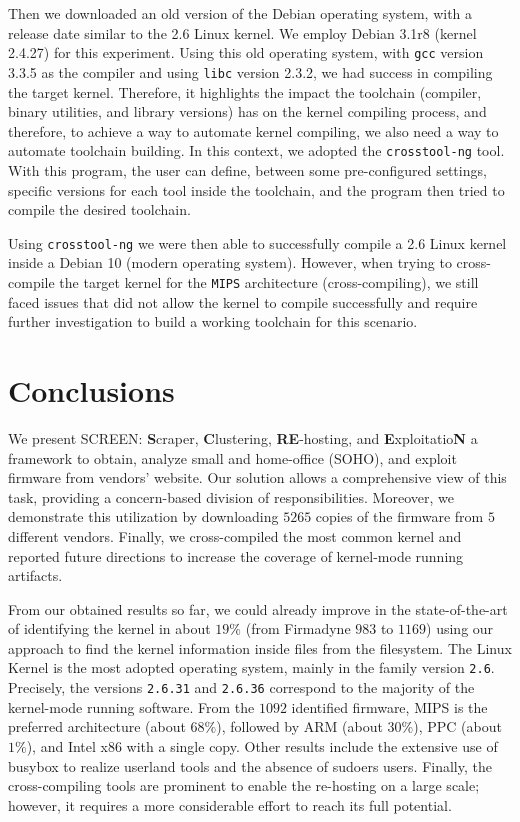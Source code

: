 \documentclass[12pt]{article}
\begin{document}
Then we downloaded an old version of the Debian operating system, with a release date similar to the 2.6 Linux kernel. We employ Debian 3.1r8 (kernel 2.4.27) for this experiment. Using this old operating system, with {\tt gcc} version 3.3.5 as the compiler and using {\tt libc} version 2.3.2, we had success in compiling the target kernel. Therefore, it highlights the impact the toolchain (compiler, binary utilities, and library versions) has on the kernel compiling process, and therefore, to achieve a way to automate kernel compiling, we also need a way to automate toolchain building. In this context, we adopted the {\tt crosstool-ng} tool. With this program, the user can define, between some pre-configured settings, specific versions for each tool inside the toolchain, and the program then tried to compile the desired toolchain.

Using {\tt crosstool-ng} we were then able to successfully compile a 2.6 Linux kernel inside a Debian 10 (modern operating system). However, when trying to cross-compile the target kernel for the {\tt MIPS} architecture (cross-compiling), we still faced issues that did not allow the kernel to compile successfully and require further investigation to build a working toolchain for this scenario.

\section{Conclusions}
\label{sec:conclusions}

We present SCREEN: {\bf S}craper, {\bf C}lustering, {\bf RE}-hosting, and {\bf E}xploitatio{\bf N} a framework to obtain, analyze small and home-office (SOHO), and exploit firmware from vendors' website.  Our solution allows a comprehensive view of this task, providing a concern-based division of responsibilities.  Moreover, we demonstrate this utilization by downloading $5265$ copies of the firmware from $5$ different vendors. Finally, we cross-compiled the most common kernel and reported future directions to increase the coverage of kernel-mode running artifacts.

From our obtained results so far, we could already improve in the state-of-the-art of identifying the kernel in about $19\%$ (from Firmadyne $983$ to $1169$) using our approach to find the kernel information inside files from the filesystem.  The Linux Kernel is the most adopted operating system, mainly in the family version {\tt 2.6}.  Precisely, the versions {\tt 2.6.31} and {\tt 2.6.36} correspond to the majority of the kernel-mode running software.  From the $1092$ identified firmware, MIPS is the preferred architecture (about $68\%$), followed by ARM (about $30\%$), PPC (about $1\%$), and Intel x86 with a single copy.  Other results include the extensive use of busybox to realize userland tools and the absence of sudoers users.  Finally, the cross-compiling tools are prominent to enable the re-hosting on a large scale; however, it requires a more considerable effort to reach its full potential.
\end{document}
